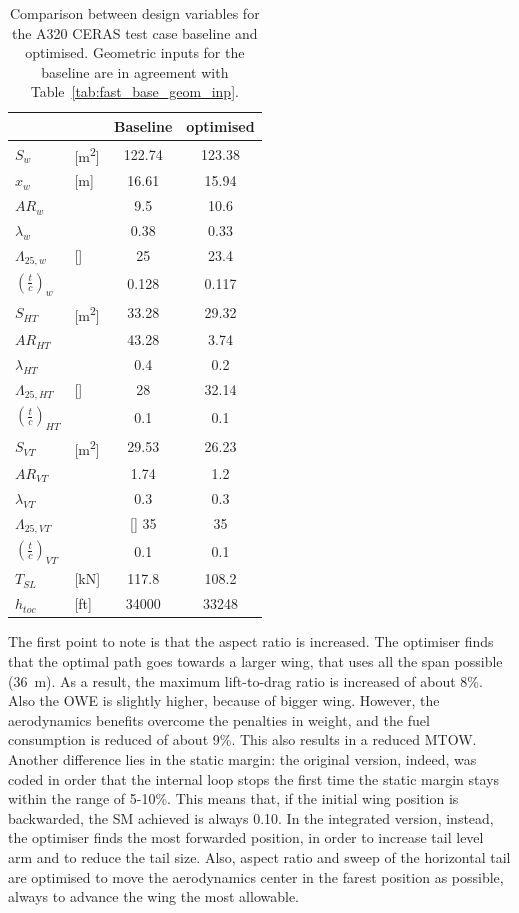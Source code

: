\begin{table}[!h]
	\centering
	\begin{tabular}{l l c c}
		\hline
		& & \textbf{Baseline} & \textbf{optimised} \\
		\hline
		$S_w$ & [\si{\square\meter}] & 122.74 & 123.38  \\
		$x_w$ & [\si{\meter}] & \num{16.61} & \num{15.94}  \\
		$AR_{w}$ & & 9.5 & 10.6 \\
		$\lambda_{w}$ & & 0.38 & 0.33 \\
		$\Lambda_{25,w}$ & [\si{\deg}] & 25 & 23.4  \\
		$\left(\frac{t}{c}\right)_w$ & & 0.128 & 0.117\\
		$S_{HT}$ & [\si{\square\meter}] & 33.28 & 29.32  \\
		$AR_{HT}$ & & 43.28 & 3.74  \\
		$\lambda_{HT}$ & & 0.4 & 0.2  \\
		$\Lambda_{25,HT}$ & [\si{\deg}] & 28 & 32.14  \\
		$\left(\frac{t}{c}\right)_{HT}$ & & 0.1 & 0.1 \\
		$S_{VT}$ & [\si{\square\meter}] & 29.53 & 26.23  \\
		$AR_{VT}$ & & 1.74 & 1.2 \\
		$\lambda_{VT}$ & & 0.3 & 0.3  \\
		$\Lambda_{25,VT}$ & & [\si{\deg}] 35 & 35  \\
		$\left(\frac{t}{c}\right)_{VT}$ & & 0.1 & 0.1  \\
		$T_{SL}$ & [\si{\kilo\newton}] & 117.8 & 108.2  \\
		$h_{toc}$ & [ft] & 34000 & 33248  \\
		\hline
	\end{tabular}
	\caption{Comparison between design variables for the A320 CERAS test case baseline and optimised. Geometric inputs for the baseline are in agreement with Table~\ref{tab:fast_base_geom_inp}.}
	\label{tab:a320_base_optim_dv}
\end{table}

The first point to note is that the aspect ratio is increased. 
The optimiser finds that the optimal path goes towards a larger wing, that uses all the span possible (36~\si{\meter}).
As a result, the maximum lift-to-drag ratio is increased of about 8\%.
Also the OWE is slightly higher, because of bigger wing. 
However, the aerodynamics benefits overcome the penalties in weight, and the fuel consumption is reduced of about 9\%. 
This also results in a reduced MTOW. 
Another difference lies in the static margin: the original version, indeed, was coded in order that the internal loop stops the first time the static margin stays within the range of 5-10\%. 
This means that, if the initial wing position is backwarded, the SM achieved is always 0.10. 
In the integrated version, instead, the optimiser finds the most forwarded position, in order to increase tail level arm and to reduce the tail size. 
Also, aspect ratio and sweep of the horizontal tail are optimised to move the aerodynamics center in the farest position as possible, always to advance the wing the most allowable. 

